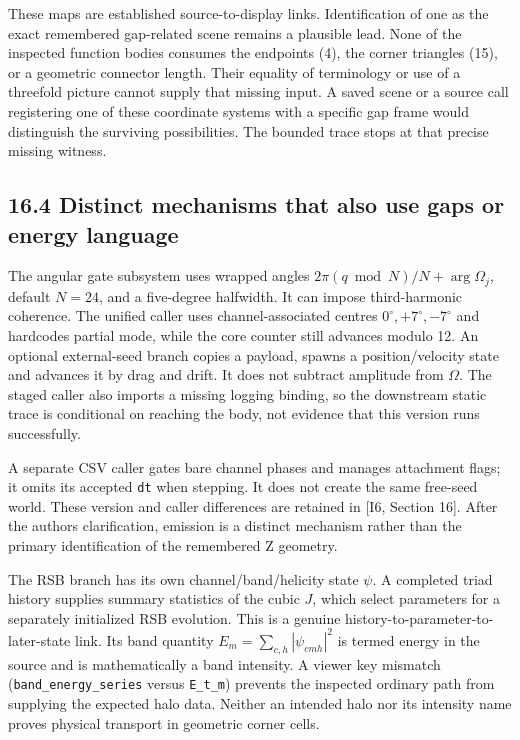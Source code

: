 \documentclass[
  11pt,
  a4paper,
]{article}
\begin{document}
These maps are established source-to-display links. Identification of one as the exact remembered gap-related scene remains a plausible lead. None of the inspected function bodies consumes the endpoints (4), the corner triangles (15), or a geometric connector length. Their equality of terminology or use of a threefold picture cannot supply that missing input. A saved scene or a source call registering one of these coordinate systems with a specific gap frame would distinguish the surviving possibilities. The bounded trace stops at that precise missing witness.

\subsection{16.4 Distinct mechanisms that also use gaps or energy language}\label{distinct-mechanisms-that-also-use-gaps-or-energy-language}

The angular gate subsystem uses wrapped angles \(2\pi(q\bmod N)/N+\arg\Omega_j\), default \(N=24\), and a five-degree halfwidth. It can impose third-harmonic coherence. The unified caller uses channel-associated centres \(0^\circ,+7^\circ,-7^\circ\) and hardcodes partial mode, while the core counter still advances modulo 12. An optional external-seed branch copies a payload, spawns a position/velocity state and advances it by drag and drift. It does not subtract amplitude from \(\Omega\). The staged caller also imports a missing logging binding, so the downstream static trace is conditional on reaching the body, not evidence that this version runs successfully.

A separate CSV caller gates bare channel phases and manages attachment flags; it omits its accepted \texttt{dt} when stepping. It does not create the same free-seed world. These version and caller differences are retained in {[}I6, Section 16{]}. After the author\textquotesingle s clarification, emission is a distinct mechanism rather than the primary identification of the remembered Z geometry.

The RSB branch has its own channel/band/helicity state \(\psi\). A completed triad history supplies summary statistics of the cubic \(J\), which select parameters for a separately initialized RSB evolution. This is a genuine history-to-parameter-to-later-state link. Its band quantity \(E_m=\sum_{c,h}|\psi_{cmh}|^2\) is termed energy in the source and is mathematically a band intensity. A viewer key mismatch (\texttt{band\_energy\_series} versus \texttt{E\_t\_m}) prevents the inspected ordinary path from supplying the expected halo data. Neither an intended halo nor its intensity name proves physical transport in geometric corner cells.
\end{document}
